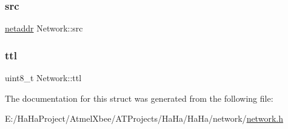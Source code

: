 \mbox{\label{struct_network_aea4b9cff07746e6716d666b8f30206c3}} 
\subsubsection{\texorpdfstring{src}{src}}
{\footnotesize\ttfamily \hyperlink{network_8h_a1924fa1e3480e5fb3c72b8ef3e243f57}{netaddr} Network\+::src}

\mbox{\label{struct_network_ae8a4e88963892ccee2ef2c239bb3db96}} 
\subsubsection{\texorpdfstring{ttl}{ttl}}
{\footnotesize\ttfamily uint8\+\_\+t Network\+::ttl}



The documentation for this struct was generated from the following file\+:\begin{DoxyCompactItemize}
\item 
E\+:/\+Ha\+Ha\+Project/\+Atmel\+Xbee/\+A\+T\+Projects/\+Ha\+Ha/\+Ha\+Ha/network/\hyperlink{network_8h}{network.\+h}\end{DoxyCompactItemize}
